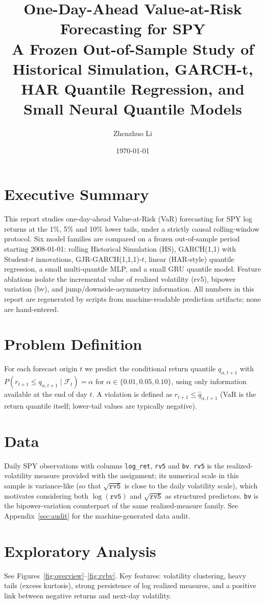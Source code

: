 \documentclass[11pt]{article}
\title{One-Day-Ahead Value-at-Risk Forecasting for SPY\\[2mm]
\large A Frozen Out-of-Sample Study of Historical Simulation, GARCH-t, HAR Quantile Regression, and Small Neural Quantile Models}
\author{Zhenzhuo Li}
\date{\today}
\begin{document}
\maketitle

\section{Executive Summary}
This report studies one-day-ahead Value-at-Risk (VaR) forecasting for SPY log returns at the 1\%, 5\% and 10\% lower tails, under a strictly causal rolling-window protocol. Six model families are compared on a frozen out-of-sample period starting 2008-01-01: rolling Historical Simulation (HS), GARCH(1,1) with Student-$t$ innovations, GJR-GARCH(1,1,1)-$t$, linear (HAR-style) quantile regression, a small multi-quantile MLP, and a small GRU quantile model. Feature ablations isolate the incremental value of realized volatility (rv5), bipower variation (bv), and jump/downside-asymmetry information. All numbers in this report are regenerated by scripts from machine-readable prediction artifacts; none are hand-entered.

\section{Problem Definition}
For each forecast origin $t$ we predict the conditional return quantile $q_{\alpha,t+1}$ with $P(r_{t+1}\le q_{\alpha,t+1}\mid\mathcal{F}_t)=\alpha$ for $\alpha\in\{0.01,0.05,0.10\}$, using only information available at the end of day $t$. A violation is defined as $r_{t+1}\le \hat{q}_{\alpha,t+1}$ (VaR is the return quantile itself; lower-tail values are typically negative).

\section{Data}
Daily SPY observations with columns \texttt{log\_ret}, \texttt{rv5} and \texttt{bv}. \texttt{rv5} is the realized-volatility measure provided with the assignment; its numerical scale in this sample is variance-like (so that $\sqrt{\texttt{rv5}}$ is close to the daily volatility scale), which motivates considering both $\log(\texttt{rv5})$ and $\sqrt{\texttt{rv5}}$ as structured predictors. \texttt{bv} is the bipower-variation counterpart of the same realized-measure family. See Appendix~\ref{sec:audit} for the machine-generated data audit.

\section{Exploratory Analysis}
See Figures~\ref{fig:overview}--\ref{fig:rvbv}. Key features: volatility clustering, heavy tails (excess kurtosis), strong persistence of log realized measures, and a positive link between negative returns and next-day volatility.
\end{document}
